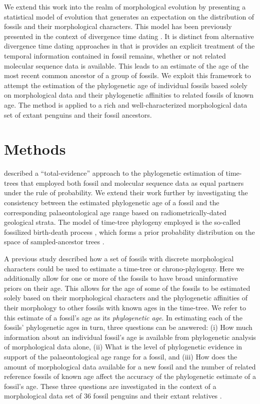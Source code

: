 \documentclass[11pt]{article}
\begin{document}
We extend this work into the realm of morphological evolution by presenting a statistical model of evolution that generates an expectation on the distribution of fossils and their morphological characters. This model has been previously presented in the context of divergence time dating \autocite{gavr2014,gavryushkina2015bayesian}. It is distinct from alternative divergence time dating approaches in that is provides an explicit treatment of the temporal information contained in fossil remains, whether or not related molecular sequence data is available. This leads to an estimate of the age of the most recent common ancestor of a group of fossils. We exploit this framework to attempt the estimation of the phylogenetic age of individual fossils based solely on morphological data and their phylogenetic affinities to related fossils of known age. The method is applied to a rich and well-characterized morphological data set of extant penguins and their fossil ancestors.

\section*{Methods}

\textcite{gavryushkina2015bayesian} described a ``total-evidence'' approach to the phylogenetic estimation of time-trees that employed both fossil and molecular sequence data as equal partners under the rule of probability. We extend their work further by investigating the consistency between the estimated phylogenetic age of a fossil and the corresponding palaeontological age range based on radiometrically-dated geological strata. The model of time-tree phylogeny employed is the so-called fossilized birth-death process \autocite{Heath2014}, which forms a prior probability distribution on the space of sampled-ancestor trees \autocite{Gavr2013}.

A previous study described how a set of fossils with discrete morphological characters could be used to estimate a time-tree or chrono-phylogeny. Here we additionally allow for one or more of the fossils to have broad uninformative priors on their age. This allows for the age of some of the fossils to be estimated solely based on their morphological characters and the phylogenetic affinities of their morphology to other fossils with known ages in the time-tree. We refer to this estimate of a fossil's age as its {\em phylogenetic age}. In estimating each of the fossils' phylogenetic ages in turn, three questions can be answered: (i) How much information about an individual fossil's age is available from phylogenetic analysis of morphological data alone, (ii) What is the level of phylogenetic evidence in support of the palaeontological age range for a fossil, and (iii) How does the amount of morphological data available for a new fossil and the number of related reference fossils of known age affect the accuracy of the phylogenetic estimate of a fossil's age. These three questions are investigated in the context of a morphological data set of 36 fossil penguins and their extant relatives \autocite{gavryushkina2015bayesian}.
\end{document}

